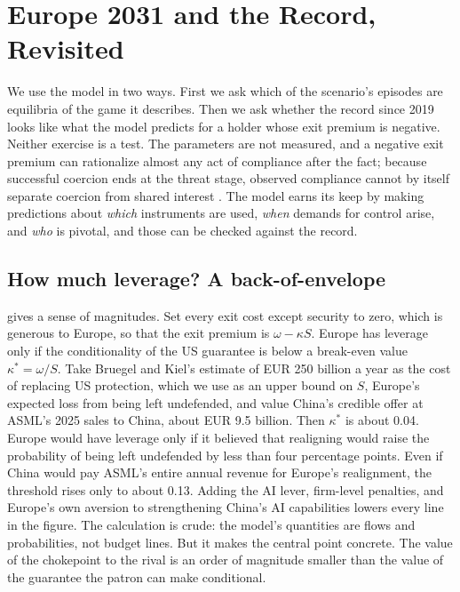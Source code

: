 \section{Europe 2031 and the Record, Revisited}\label{sec:revisited}

We use the model in two ways. First we ask which of the scenario's episodes are equilibria of the game it describes. Then we ask whether the record since 2019 looks like what the model predicts for a holder whose exit premium is negative. Neither exercise is a test. The parameters are not measured, and a negative exit premium can rationalize almost any act of compliance after the fact; because successful coercion ends at the threat stage, observed compliance cannot by itself separate coercion from shared interest \citep{drezner2003hidden}. The model earns its keep by making predictions about \emph{which} instruments are used, \emph{when} demands for control arise, and \emph{who} is pivotal, and those can be checked against the record.

\subsection{How much leverage? A back-of-envelope}

 gives a sense of magnitudes. Set every exit cost except security to zero, which is generous to Europe, so that the exit premium is $\omega - \kappa S$. Europe has leverage only if the conditionality of the US guarantee is below a break-even value $\kappa^* = \omega/S$. Take Bruegel and Kiel's estimate of EUR 250 billion a year as the cost of replacing US protection, which we use as an upper bound on $S$, Europe's expected loss from being left undefended, and value China's credible offer at ASML's 2025 sales to China, about EUR 9.5 billion. Then $\kappa^*$ is about 0.04. Europe would have leverage only if it believed that realigning would raise the probability of being left undefended by less than four percentage points. Even if China would pay ASML's entire annual revenue for Europe's realignment, the threshold rises only to about 0.13. Adding the AI lever, firm-level penalties, and Europe's own aversion to strengthening China's AI capabilities lowers every line in the figure. The calculation is crude: the model's quantities are flows and probabilities, not budget lines. But it makes the central point concrete. The value of the chokepoint to the rival is an order of magnitude smaller than the value of the guarantee the patron can make conditional.

